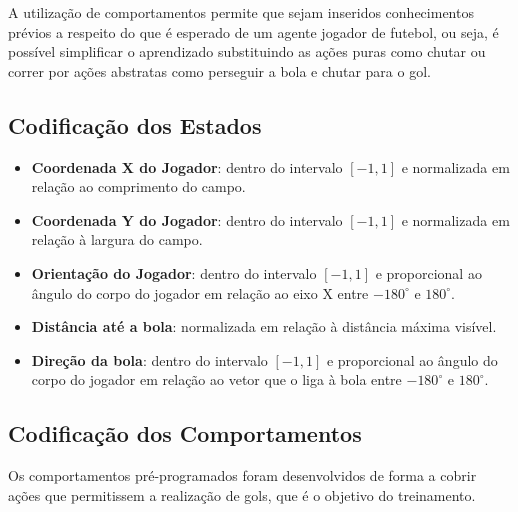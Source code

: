 A utilização de comportamentos permite que sejam inseridos conhecimentos prévios a respeito do que é esperado de um agente jogador de futebol, ou seja, é possível simplificar o aprendizado substituindo as ações puras como chutar ou correr por ações abstratas como perseguir a bola e chutar para o gol.

\subsection{Codificação dos Estados}
\label{subsubsec:state-approx}
\begin{itemize}
	\item \textbf{Coordenada X do Jogador}: dentro do intervalo $[-1, 1]$ e normalizada em relação ao comprimento do campo.
	\item \textbf{Coordenada Y do Jogador}: dentro do intervalo $[-1, 1]$ e normalizada em relação à largura do campo.
	\item \textbf{Orientação do Jogador}: dentro do intervalo $[-1, 1]$ e proporcional ao ângulo do corpo do jogador em relação ao eixo X entre $-180^{\circ}$ e $180^{\circ}$.
	\item \textbf{Distância até a bola}: normalizada em relação à distância máxima visível.
	\item \textbf{Direção da bola}: dentro do intervalo $[-1, 1]$ e proporcional ao ângulo do corpo do jogador em relação ao vetor que o liga à bola entre $-180^{\circ}$ e $180^{\circ}$. 
	
\end{itemize}

\subsection{Codificação dos Comportamentos}
\label{subsubsec:behaviors-mapping}
Os comportamentos pré-programados foram desenvolvidos de forma a cobrir ações que permitissem a realização de gols, que é o objetivo do treinamento.

